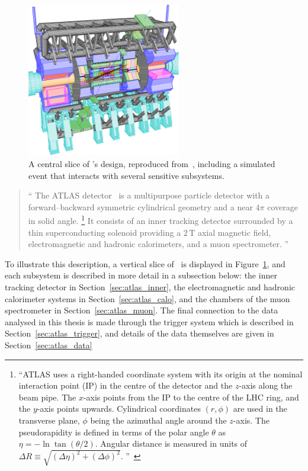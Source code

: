 \begin{figure}[tp]
\centering
\includegraphics[width=0.6\textwidth]{figures/atlas_cutaway_volume_1.pdf}
\caption[
A central slice of \atlas's design
]{%
A central slice of \atlas's design, reproduced from~\cite{atlas1999design1,
persint2014manual},
including a simulated event that interacts with several sensitive subsystems.
}
\label{fig:atlas_cutaway}
\end{figure}

\begin{quote}
``%
The ATLAS detector~\cite{atlas2008experiment} is a multipurpose particle
detector with a forward--backward symmetric cylindrical geometry and a near
$4\pi$ coverage in solid angle.%
\footnote{%
``ATLAS uses a right-handed coordinate system with its origin at the nominal
interaction point (IP) in the centre of the detector and the $z$-axis along the
beam pipe.
The $x$-axis points from the IP to the centre of the LHC ring, and the $y$-axis
points upwards.
Cylindrical coordinates $(r,\phi)$ are used in the transverse plane, $\phi$
being the azimuthal angle around the $z$-axis.
The pseudorapidity is defined in terms of the polar angle $\theta$ as
$\eta = -\ln \tan(\theta/2)$.
Angular distance is measured in units of
$\Delta R \equiv \sqrt{(\Delta\eta)^{2} + (\Delta\phi)^{2}}$.%
''\footnotemark~\cite{atlas2022searches}%
}
It consists of an inner tracking detector surrounded by a thin superconducting
solenoid providing a $2\,\mathrm{T}$ axial magnetic field, electromagnetic and
hadronic calorimeters, and a muon spectrometer.%
''~\cite{atlas2022searches}
\end{quote}
To illustrate this description, a vertical slice of \atlas\ is displayed in
Figure~\ref{fig:atlas_cutaway}, and each subsystem is described in more detail
in a subsection below:
the inner tracking detector in Section~\ref{sec:atlas_inner},
the electromagnetic and hadronic calorimeter systems in
Section~\ref{sec:atlas_calo},
and
the chambers of the muon spectrometer in Section~\ref{sec:atlas_muon}.
The final connection to the data analysed in this thesis is made through the
trigger system which is described in Section~\ref{sec:atlas_trigger},
and details of the data themselves are given in
Section~\ref{sec:atlas_data}

